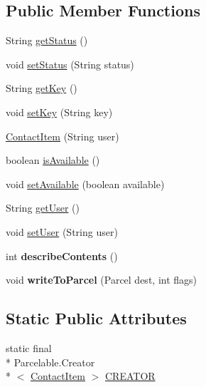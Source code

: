 \subsection*{Public Member Functions}
\begin{DoxyCompactItemize}
\item 
String \hyperlink{classat_1_1fhooe_1_1kls_1_1_contact_item_af1f43d95bd94395f0d87a1be8580d6ca}{get\-Status} ()
\item 
void \hyperlink{classat_1_1fhooe_1_1kls_1_1_contact_item_a19a0512d7cbe6253086d6e294a55d585}{set\-Status} (String status)
\item 
String \hyperlink{classat_1_1fhooe_1_1kls_1_1_contact_item_a19a4928d65a8a6532715b97698f607a8}{get\-Key} ()
\item 
void \hyperlink{classat_1_1fhooe_1_1kls_1_1_contact_item_a08cb3afc0c957b819845a8457310dd9a}{set\-Key} (String key)
\item 
\hyperlink{classat_1_1fhooe_1_1kls_1_1_contact_item_a99b2c4911722c8541590f1a4054ae7d2}{Contact\-Item} (String user)
\item 
boolean \hyperlink{classat_1_1fhooe_1_1kls_1_1_contact_item_ad17437e32337fb420f0f267684f17bdf}{is\-Available} ()
\item 
void \hyperlink{classat_1_1fhooe_1_1kls_1_1_contact_item_a0603f2a475b655ce47b5a250e4b4126f}{set\-Available} (boolean available)
\item 
String \hyperlink{classat_1_1fhooe_1_1kls_1_1_contact_item_a48b17be59f0a5aba44e98b68b6aa428b}{get\-User} ()
\item 
void \hyperlink{classat_1_1fhooe_1_1kls_1_1_contact_item_a0e9cdcd9ae7c35d14fc819c8775fb7d2}{set\-User} (String user)
\item 
\hypertarget{classat_1_1fhooe_1_1kls_1_1_contact_item_a745ec2e9887054f910b9fd6b888cae35}{int {\bfseries describe\-Contents} ()}\label{classat_1_1fhooe_1_1kls_1_1_contact_item_a745ec2e9887054f910b9fd6b888cae35}

\item 
\hypertarget{classat_1_1fhooe_1_1kls_1_1_contact_item_a70c2cdc5c6f5c1f1c1b1269f3d4a8f9b}{void {\bfseries write\-To\-Parcel} (Parcel dest, int flags)}\label{classat_1_1fhooe_1_1kls_1_1_contact_item_a70c2cdc5c6f5c1f1c1b1269f3d4a8f9b}

\end{DoxyCompactItemize}
\subsection*{Static Public Attributes}
\begin{DoxyCompactItemize}
\item 
static final \\*
Parcelable.\-Creator\\*
$<$ \hyperlink{classat_1_1fhooe_1_1kls_1_1_contact_item}{Contact\-Item} $>$ \hyperlink{classat_1_1fhooe_1_1kls_1_1_contact_item_a065aa2309427edaab34a0cf7e1864eb3}{C\-R\-E\-A\-T\-O\-R}
\end{DoxyCompactItemize}


